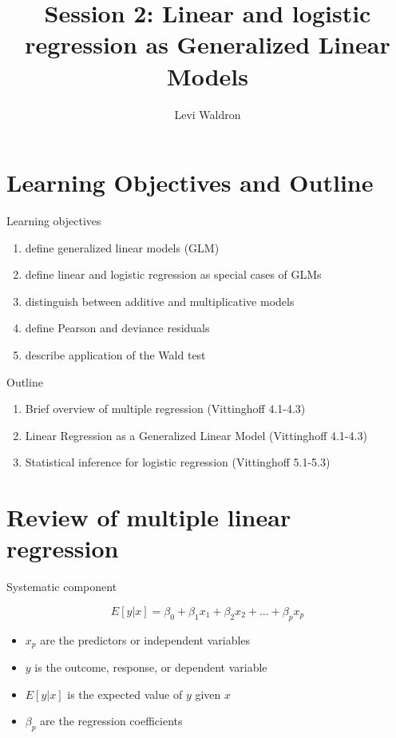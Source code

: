\documentclass[
  ignorenonframetext,
]{beamer}
\title{Session 2: Linear and logistic regression as Generalized Linear Models}
\author{Levi Waldron}
\date{}
\institute{CUNY SPH Biostatistics 2}
\providecommand{\tightlist}{%
  \setlength{\itemsep}{0pt}\setlength{\parskip}{0pt}}
\begin{document}
\frame{\titlepage}

\hypertarget{learning-objectives-and-outline}{%
\section{Learning Objectives and
Outline}\label{learning-objectives-and-outline}}

\begin{frame}{Learning objectives}
\protect\hypertarget{learning-objectives}{}

\begin{enumerate}
\tightlist
\item
  define generalized linear models (GLM)
\item
  define linear and logistic regression as special cases of GLMs
\item
  distinguish between additive and multiplicative models
\item
  define Pearson and deviance residuals
\item
  describe application of the Wald test
\end{enumerate}

\end{frame}

\begin{frame}{Outline}
\protect\hypertarget{outline}{}

\begin{enumerate}
\tightlist
\item
  Brief overview of multiple regression (Vittinghoff 4.1-4.3)
\item
  Linear Regression as a Generalized Linear Model (Vittinghoff 4.1-4.3)
\item
  Statistical inference for logistic regression (Vittinghoff 5.1-5.3)
\end{enumerate}

\end{frame}

\hypertarget{review-of-multiple-linear-regression}{%
\section{Review of multiple linear
regression}\label{review-of-multiple-linear-regression}}

\begin{frame}{Systematic component}
\protect\hypertarget{systematic-component}{}

\[
E[y|x] = \beta_0 + \beta_1 x_1 + \beta_2 x_2 + ... + \beta_p x_p
\]

\begin{itemize}
\tightlist
\item
  \(x_p\) are the predictors or independent variables
\item
  \(y\) is the outcome, response, or dependent variable
\item
  \(E[y|x]\) is the expected value of \(y\) given \(x\)
\item
  \(\beta_p\) are the regression coefficients
\end{itemize}

\end{frame}
\end{document}
